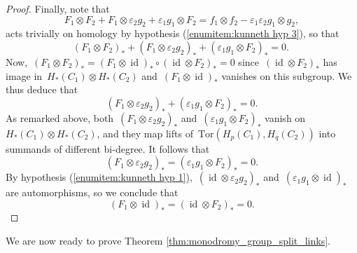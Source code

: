 \documentclass{amsart}
\theoremstyle{definition}
\theoremstyle{definition}
\theoremstyle{definition}
\theoremstyle{definition}
\DeclareMathOperator{\id}{id}
\begin{document}
\begin{proof}
     Finally, note that 
    ~$$F_1\otimes F_2 + F_1\otimes \varepsilon_2 g_2 + \varepsilon_1 g_1\otimes F_2 = f_1\otimes f_2 - \varepsilon_1 \varepsilon_2 g_1\otimes g_2,$$
     acts trivially on homology by hypothesis (\ref{enumitem:kunneth hyp 3}), so that
    ~$$(F_1\otimes F_2)_* + (F_1\otimes \varepsilon_2 g_2)_* + (\varepsilon_1 g_1\otimes F_2)_* = 0 .~$$
     Now,~$(F_1\otimes F_2)_* = (F_1\otimes \id)_* \circ (\id\otimes F_2)_* = 0$ since~$(\id\otimes F_2)_*$ has image in~$H_*(C_1)\otimes H_*(C_2)$ and~$(F_1\otimes \id)_*$ vanishes on this subgroup. We thus deduce that
    ~$$(F_1\otimes \varepsilon_2 g_2)_* + (\varepsilon_1 g_1\otimes F_2)_* = 0.$$ As remarked above, both~$(F_1\otimes \varepsilon_2 g_2)_*$ and~$(\varepsilon_1 g_1\otimes F_2)_*$ vanish on~$H_*(C_1)\otimes H_*(C_2)$, and they map lifts of~$\mathrm{Tor}(H_p(C_1),H_q(C_2))$ into summands of different bi-degree. It follows that 
    ~$$(F_1\otimes \varepsilon_2 g_2)_* = (\varepsilon_1 g_1\otimes F_2)_* = 0.$$
     By hypothesis (\ref{enumitem:kunneth hyp 1}),~$(\id\otimes \varepsilon_2 g_2)_*$ and~$(\varepsilon_1 g_1\otimes \id)_*$ are automorphisms, so we conclude that
    ~$$(F_1\otimes \id)_* = (\id\otimes F_2)_* = 0.$$    
 \end{proof}

 We are now ready to prove Theorem \ref{thm:monodromy_group_split_links}.
 
\end{document}
